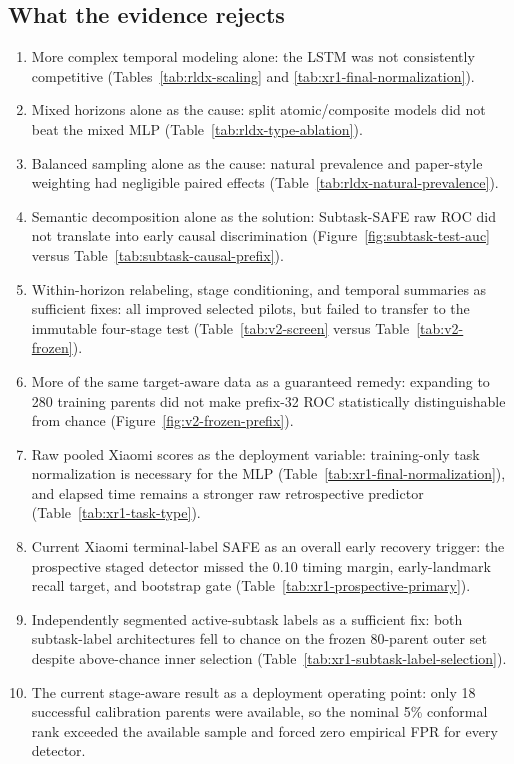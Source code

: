 \documentclass[11pt,a4paper]{article}
\begin{document}
\subsection{What the evidence rejects}
\begin{enumerate}
\item More complex temporal modeling alone: the LSTM was not consistently
competitive (Tables~\ref{tab:rldx-scaling} and
\ref{tab:xr1-final-normalization}).
\item Mixed horizons alone as the cause: split atomic/composite models did not
beat the mixed MLP (Table~\ref{tab:rldx-type-ablation}).
\item Balanced sampling alone as the cause: natural prevalence and paper-style
weighting had negligible paired effects
(Table~\ref{tab:rldx-natural-prevalence}).
\item Semantic decomposition alone as the solution: Subtask-SAFE raw ROC did
not translate into early causal discrimination
(Figure~\ref{fig:subtask-test-auc} versus
Table~\ref{tab:subtask-causal-prefix}).
\item Within-horizon relabeling, stage conditioning, and temporal summaries as
sufficient fixes: all improved selected pilots, but failed to transfer to the
immutable four-stage test (Table~\ref{tab:v2-screen} versus
Table~\ref{tab:v2-frozen}).
\item More of the same target-aware data as a guaranteed remedy: expanding to
280 training parents did not make prefix-32 ROC statistically distinguishable
from chance (Figure~\ref{fig:v2-frozen-prefix}).
\item Raw pooled Xiaomi scores as the deployment variable: training-only task
normalization is necessary for the MLP
(Table~\ref{tab:xr1-final-normalization}), and elapsed time remains a stronger
raw retrospective predictor (Table~\ref{tab:xr1-task-type}).
\item Current Xiaomi terminal-label SAFE as an overall early recovery trigger:
the prospective staged detector missed the 0.10 timing margin, early-landmark
recall target, and bootstrap gate (Table~\ref{tab:xr1-prospective-primary}).
\item Independently segmented active-subtask labels as a sufficient fix: both
subtask-label architectures fell to chance on the frozen 80-parent outer set
despite above-chance inner selection
(Table~\ref{tab:xr1-subtask-label-selection}).
\item The current stage-aware result as a deployment operating point: only 18
successful calibration parents were available, so the nominal 5\% conformal
rank exceeded the available sample and forced zero empirical FPR for every
detector.
\end{enumerate}
\end{document}

